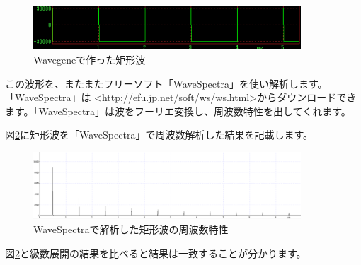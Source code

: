 \documentclass[11pt,b5paper,papersize,dvipdfmx]{jsbook}
\begin{document}
\begin{figure}[H]
  \centering
  \includegraphics[width=10cm]{nsmr/img/wavegine.png}
  \caption{Wavegeneで作った矩形波}
  \label{fig:wavegene}
\end{figure}
この波形を、またまたフリーソフト「WaveSpectra」を使い解析します。「WaveSpectra」は
\url{<http://efu.jp.net/soft/ws/ws.html>}からダウンロードできます。「WaveSpectra」は波をフーリエ変換し、周波数特性を出してくれます。\par
図\ref{fig:wavespe}に矩形波を「WaveSpectra」で周波数解析した結果を記載します。
\begin{figure}[H]
  \centering
  \includegraphics[width=10cm]{nsmr/img/kukeihawav2.png}
  \caption{WaveSpectraで解析した矩形波の周波数特性}
  \label{fig:wavespe}
\end{figure}
図\ref{fig:wavespe}と級数展開の結果を比べると結果は一致することが分かります。

%
\end{document}
